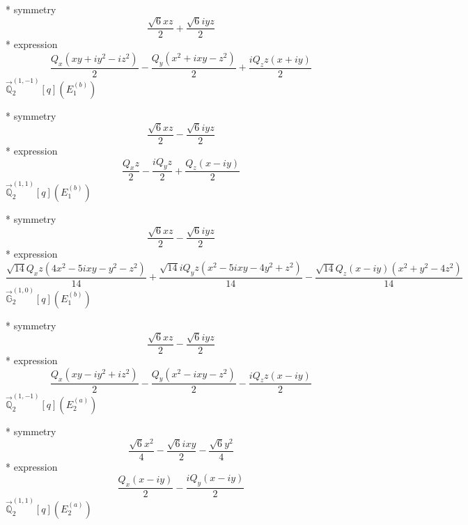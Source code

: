 \documentclass[fleqn,8pt]{jsarticle}
\begin{document}
\noindent\quad ** symmetry
\begin{dmath*}
\frac{\sqrt{6} x z}{2} + \frac{\sqrt{6} i y z}{2}
\end{dmath*}
\noindent\quad ** expression
\begin{dmath*}
\frac{Q_{x} \left(x y + i y^{2} - i z^{2}\right)}{2} - \frac{Q_{y} \left(x^{2} + i x y - z^{2}\right)}{2} + \frac{i Q_{z} z \left(x + i y\right)}{2}
\end{dmath*}
\noindent\quad $\vec{\mathbb{Q}}_{2}^{(1,-1)}[q](E_{1}^{(b)})$

\noindent\quad ** symmetry
\begin{dmath*}
\frac{\sqrt{6} x z}{2} - \frac{\sqrt{6} i y z}{2}
\end{dmath*}
\noindent\quad ** expression
\begin{dmath*}
\frac{Q_{x} z}{2} - \frac{i Q_{y} z}{2} + \frac{Q_{z} \left(x - i y\right)}{2}
\end{dmath*}
\noindent\quad $\vec{\mathbb{Q}}_{2}^{(1,1)}[q](E_{1}^{(b)})$

\noindent\quad ** symmetry
\begin{dmath*}
\frac{\sqrt{6} x z}{2} - \frac{\sqrt{6} i y z}{2}
\end{dmath*}
\noindent\quad ** expression
\begin{dmath*}
\frac{\sqrt{14} Q_{x} z \left(4 x^{2} - 5 i x y - y^{2} - z^{2}\right)}{14} + \frac{\sqrt{14} i Q_{y} z \left(x^{2} - 5 i x y - 4 y^{2} + z^{2}\right)}{14} - \frac{\sqrt{14} Q_{z} \left(x - i y\right) \left(x^{2} + y^{2} - 4 z^{2}\right)}{14}
\end{dmath*}
\noindent\quad $\vec{\mathbb{G}}_{2}^{(1,0)}[q](E_{1}^{(b)})$

\noindent\quad ** symmetry
\begin{dmath*}
\frac{\sqrt{6} x z}{2} - \frac{\sqrt{6} i y z}{2}
\end{dmath*}
\noindent\quad ** expression
\begin{dmath*}
\frac{Q_{x} \left(x y - i y^{2} + i z^{2}\right)}{2} - \frac{Q_{y} \left(x^{2} - i x y - z^{2}\right)}{2} - \frac{i Q_{z} z \left(x - i y\right)}{2}
\end{dmath*}
\noindent\quad $\vec{\mathbb{Q}}_{2}^{(1,-1)}[q](E_{2}^{(a)})$

\noindent\quad ** symmetry
\begin{dmath*}
\frac{\sqrt{6} x^{2}}{4} - \frac{\sqrt{6} i x y}{2} - \frac{\sqrt{6} y^{2}}{4}
\end{dmath*}
\noindent\quad ** expression
\begin{dmath*}
\frac{Q_{x} \left(x - i y\right)}{2} - \frac{i Q_{y} \left(x - i y\right)}{2}
\end{dmath*}
\noindent\quad $\vec{\mathbb{Q}}_{2}^{(1,1)}[q](E_{2}^{(a)})$
\end{document}
